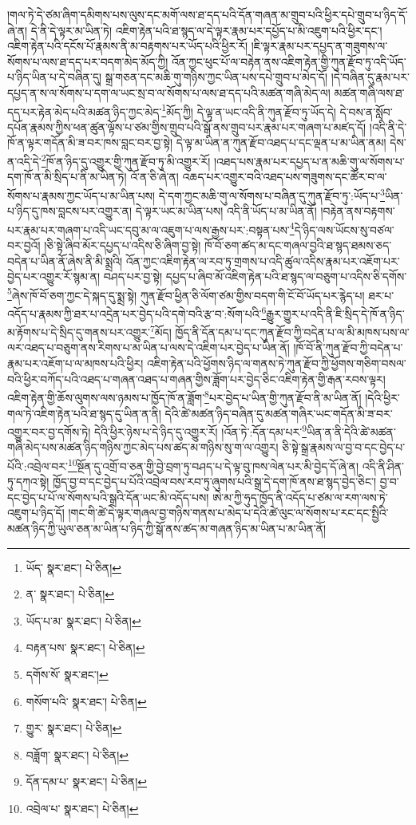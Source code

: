།གལ་ཏེ་དེ་ཙམ་ཞིག་དམིགས་པས་ལུས་དང་མགོ་ལས་ཐ་དད་པའི་དོན་གཞན་མ་གྲུབ་པའི་ཕྱིར་དཔེ་གྲུབ་པ་ཉིད་དོ་ཞེ་ན། དེ་ནི་དེ་ལྟར་མ་ཡིན་ཏེ། འཇིག་རྟེན་པའི་ཐ་སྙད་ལ་དེ་ལྟར་རྣམ་པར་དཔྱོད་པ་མི་འཇུག་པའི་ཕྱིར་དང་། འཇིག་རྟེན་པའི་དངོས་པོ་རྣམས་ནི་མ་བརྟགས་པར་ཡོད་པའི་ཕྱིར་རོ། །ཇི་ལྟར་རྣམ་པར་དཔྱད་ན་གཟུགས་ལ་སོགས་པ་ལས་ཐ་དད་པར་བདག་མེད་མོད་ཀྱི། འོན་ཀྱང་ཕུང་པོ་ལ་བརྟེན་ནས་འཇིག་རྟེན་གྱི་ཀུན་རྫོབ་ཏུ་འདི་ཡོད་པ་ཉིད་ཡིན་པ་དེ་བཞིན་དུ། སྒྲ་གཅན་དང་མཆི་གུ་གཉིས་ཀྱང་ཡིན་པས་དཔེ་གྲུབ་པ་མེད་དོ། །དེ་བཞིན་དུ་རྣམ་པར་དཔྱད་ན་ས་ལ་སོགས་པ་དག་ལ་ཡང་སྲ་བ་ལ་སོགས་པ་ལས་ཐ་དད་པའི་མཚན་གཞི་མེད་ལ། མཚན་གཞི་ལས་ཐ་དད་པར་རྟེན་མེད་པའི་མཚན་ཉིད་ཀྱང་མེད་\footnote{ཡོད་  སྣར་ཐང་།  པེ་ཅིན། }མོད་ཀྱི། དེ་ལྟ་ན་ཡང་འདི་ནི་ཀུན་རྫོབ་ཏུ་ཡོད་དེ། དེ་བས་ན་སློབ་དཔོན་རྣམས་ཀྱིས་ཕན་ཚུན་ལྟོས་པ་ཙམ་གྱིས་གྲུབ་པའི་སྒོ་ནས་གྲུབ་པར་རྣམ་པར་གཞག་པ་མཛད་དོ། །འདི་ནི་དེ་ཁོ་ན་ལྟར་གདོན་མི་ཟ་བར་ཁས་བླང་བར་བྱ་སྟེ། དེ་ལྟ་མ་ཡིན་ན་ཀུན་རྫོབ་འཐད་པ་དང་ལྡན་པ་མ་ཡིན་ནམ། དེས་ན་འདི་དེ་\footnote{ན་  སྣར་ཐང་།  པེ་ཅིན། }ཁོ་ན་ཉིད་དུ་འགྱུར་གྱི་ཀུན་རྫོབ་ཏུ་མི་འགྱུར་རོ། །འཐད་པས་རྣམ་པར་དཔྱད་པ་ན་མཆི་གུ་ལ་སོགས་པ་དག་ཁོ་ན་མི་སྲིད་པ་ནི་མ་ཡིན་ཏེ། འོ་ན་ཅི་ཞེ་ན། འཆད་པར་འགྱུར་བའི་འཐད་པས་གཟུགས་དང་ཚོར་བ་ལ་སོགས་པ་རྣམས་ཀྱང་ཡོད་པ་མ་ཡིན་པས། དེ་དག་ཀྱང་མཆི་གུ་ལ་སོགས་པ་བཞིན་དུ་ཀུན་རྫོབ་ཏུ་:ཡོད་པ་\footnote{ཡོད་པ་མ་  སྣར་ཐང་།  པེ་ཅིན། }ཡིན་པ་ཉིད་དུ་ཁས་བླངས་པར་འགྱུར་ན། དེ་ལྟར་ཡང་མ་ཡིན་པས། འདི་ནི་ཡོད་པ་མ་ཡིན་ནོ། །བརྟེན་ནས་བརྟགས་པར་རྣམ་པར་གཞག་པ་འདི་ཡང་དབུ་མ་ལ་འཇུག་པ་ལས་རྒྱས་པར་:བསྟན་པས་\footnote{བརྟན་པས་  སྣར་ཐང་།  པེ་ཅིན། }དེ་ཉིད་ལས་ཡོངས་སུ་བཙལ་བར་བྱའོ། །ཅི་སྟེ་ཞིབ་མོར་དཔྱད་པ་འདིས་ཅི་ཞིག་བྱ་སྟེ། ཁོ་བོ་ཅག་ཚད་མ་དང་གཞལ་བྱའི་ཐ་སྙད་ཐམས་ཅད་བདེན་པ་ཡིན་ནོ་ཞེས་ནི་མི་སྨྲའི། འོན་ཀྱང་འཇིག་རྟེན་ལ་རབ་ཏུ་གྲགས་པ་འདི་ཚུལ་འདིས་རྣམ་པར་འཇོག་པར་བྱེད་པར་འགྱུར་རོ་སྙམ་ན། བཤད་པར་བྱ་སྟེ། དཔྱད་པ་ཞིབ་མོ་འཇིག་རྟེན་པའི་ཐ་སྙད་ལ་བཅུག་པ་འདིས་ཅི་དགོས་\footnote{དགོས་སོ་  སྣར་ཐང་། }ཞེས་ཁོ་བོ་ཅག་ཀྱང་དེ་སྐད་དུ་སྨྲ་སྟེ། ཀུན་རྫོབ་ཕྱིན་ཅི་ལོག་ཙམ་གྱིས་བདག་གི་ངོ་བོ་ཡོད་པར་རྙེད་པ། ཐར་པ་འདོད་པ་རྣམས་ཀྱི་ཐར་པ་འདྲེན་པར་བྱེད་པའི་དགེ་བའི་རྩ་བ་:སོག་པའི་\footnote{གསོག་པའི་  སྣར་ཐང་།  པེ་ཅིན། }རྒྱུར་གྱུར་པ་འདི་ནི་ཇི་སྲིད་དེ་ཁོ་ན་ཉིད་མ་རྟོགས་པ་དེ་སྲིད་དུ་གནས་པར་འགྱུར་\footnote{གྱུར་  སྣར་ཐང་།  པེ་ཅིན། }མོད། ཁྱོད་ནི་དོན་དམ་པ་དང་ཀུན་རྫོབ་ཀྱི་བདེན་པ་ལ་མི་མཁས་པས་ལ་ལར་འཐད་པ་བཅུག་ནས་རིགས་པ་མ་ཡིན་པ་ལས་དེ་འཇིག་པར་བྱེད་པ་ཡིན་ནོ། །ཁོ་བོ་ནི་ཀུན་རྫོབ་ཀྱི་བདེན་པ་རྣམ་པར་འཇོག་པ་ལ་མཁས་པའི་ཕྱིར། འཇིག་རྟེན་པའི་ཕྱོགས་ཉིད་ལ་གནས་ཏེ་ཀུན་རྫོབ་ཀྱི་ཕྱོགས་གཅིག་བསལ་བའི་ཕྱིར་བཀོད་པའི་འཐད་པ་གཞན་འཐད་པ་གཞན་གྱིས་ཟློག་པར་བྱེད་ཅིང་འཇིག་རྟེན་གྱི་རྒན་རབས་ལྟར། འཇིག་རྟེན་གྱི་ཆོས་ལུགས་ལས་ཉམས་པ་ཁྱོད་ཁོ་ན་ཟློག་\footnote{བཟློག་  སྣར་ཐང་།  པེ་ཅིན། }པར་བྱེད་པ་ཡིན་གྱི་ཀུན་རྫོབ་ནི་མ་ཡིན་ནོ། །དེའི་ཕྱིར་གལ་ཏེ་འཇིག་རྟེན་པའི་ཐ་སྙད་དུ་ཡིན་ན་ནི། དེའི་ཚེ་མཚན་ཉིད་བཞིན་དུ་མཚན་གཞིར་ཡང་གདོན་མི་ཟ་བར་འགྱུར་བར་བྱ་དགོས་ཏེ། དེའི་ཕྱིར་ཉེས་པ་དེ་ཉིད་དུ་འགྱུར་རོ། །འོན་ཏེ་:དོན་དམ་པར་\footnote{དོན་དམ་པ་  སྣར་ཐང་།  པེ་ཅིན། }ཡིན་ན་ནི་དེའི་ཚེ་མཚན་གཞི་མེད་པས་མཚན་ཉིད་གཉིས་ཀྱང་མེད་པས་ཚད་མ་གཉིས་སུ་ག་ལ་འགྱུར། ཅི་སྟེ་སྒྲ་རྣམས་ལ་བྱ་བ་དང་བྱེད་པ་པོའི་:འབྲེལ་བར་\footnote{འབྲེལ་པ་  སྣར་ཐང་།  པེ་ཅིན། }སྔོན་དུ་འགྲོ་བ་ཅན་གྱི་བྱེ་བྲག་ཏུ་བཤད་པ་དེ་ལྟ་བུ་ཁས་ལེན་པར་མི་བྱེད་དོ་ཞེ་ན། འདི་ནི་ཤིན་ཏུ་དཀའ་སྟེ། ཁྱོད་བྱ་བ་དང་བྱེད་པ་པོའི་འབྲེལ་བས་རབ་ཏུ་ཞུགས་པའི་སྒྲ་དེ་དག་ཁོ་ནས་ཐ་སྙད་བྱེད་ཅིང་། བྱ་བ་དང་བྱེད་པ་པོ་ལ་སོགས་པའི་སྒྲའི་དོན་ཡང་མི་འདོད་པས། ཨེ་མ་ཀྱི་ཧུད་ཁྱོད་ནི་འདོད་པ་ཙམ་ལ་རག་ལས་ཏེ་འཇུག་པ་ཉིད་དོ། །གང་གི་ཚེ་དེ་ལྟར་གཞལ་བྱ་གཉིས་གནས་པ་མེད་པ་དེའི་ཚེ་ལུང་ལ་སོགས་པ་རང་དང་སྤྱིའི་མཚན་ཉིད་ཀྱི་ཡུལ་ཅན་མ་ཡིན་པ་ཉིད་ཀྱི་སྒོ་ནས་ཚད་མ་གཞན་ཉིད་མ་ཡིན་པ་མ་ཡིན་ནོ། 